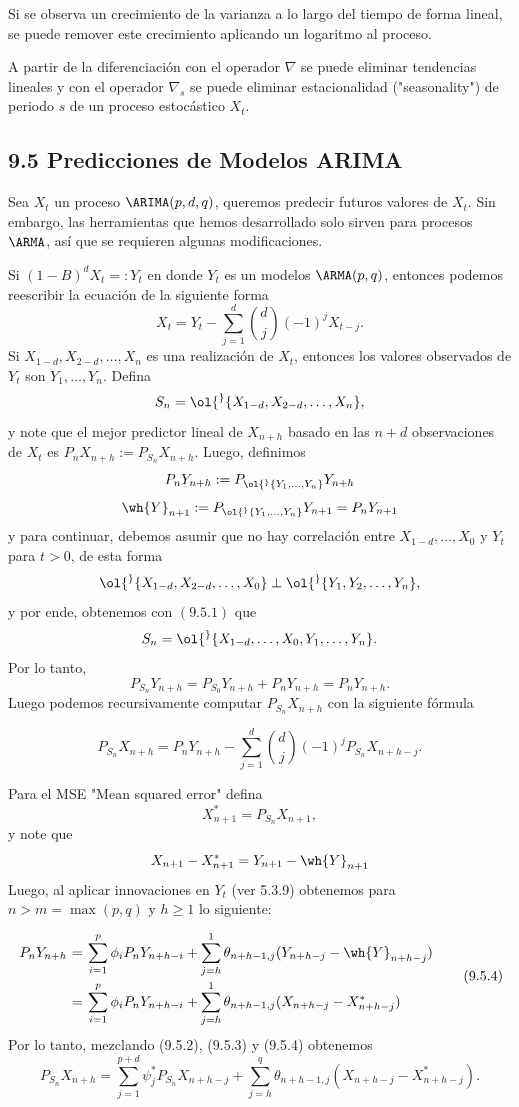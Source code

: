 Si se observa un crecimiento de la varianza a lo largo del tiempo de forma lineal, se puede remover este crecimiento aplicando un logaritmo al proceso.

A partir de la diferenciación con el operador $\nabla$ se puede eliminar tendencias lineales y con el operador $\nabla_s$ se puede eliminar estacionalidad ("seasonality") de periodo $s$ de un proceso estocástico $X_t$.

\subsection*{9.5 Predicciones de Modelos ARIMA}

Sea $X_t$ un proceso $\ARIMA(p,d,q)$, queremos predecir futuros valores de $X_t$. Sin embargo, las herramientas que hemos desarrollado solo sirven para procesos $\ARMA$, así que se requieren algunas modificaciones.

Si $(1-B)^d X_t =: Y_t$ en donde $Y_t$ es un modelos $\ARMA(p,q)$, entonces podemos reescribir la ecuación de la siguiente forma
\[ X_t = Y_t - \sum_{j = 1}^{d} \binom{d}{j} (-1)^j  X_{t-j}. \tag{9.5.1}\]
Si $X_{1-d},X_{2-d},\ldots,X_n$ es una realización de $X_t$, entonces los valores observados de $Y_t$ son $Y_1,\ldots, Y_n$. Defina
\[ S_n = \ol{\sp}\{X_{1-d},X_{2-d},\ldots,X_n\}, \]
y note que el mejor predictor lineal de $X_{n+h}$ basado en las $n+d$ observaciones de $X_t$ es $P_n X_{n+h} := P_{S_n} X_{n+h}$. Luego, definimos
\[ P_n Y_{n+h} := P_{\ol{\sp}\{Y_1,\ldots, Y_n\}} Y_{n+h} \]
\[ \wh{Y}_{n+1} := P_{\ol{\sp}\{Y_1,\ldots, Y_n\}} Y_{n+1} = P_n Y_{n+1} \]
y para continuar, debemos asumir que no hay correlación entre $X_{1-d},\ldots, X_0$ y $Y_t$ para $t > 0$, de esta forma
\[ \ol{\sp}\{X_{1-d},X_{2-d},\ldots,X_0\} \perp \ol{\sp}\{Y_{1},Y_{2},\ldots,Y_n\}, \]
y por ende, obtenemos con $(9.5.1)$ que
\[ S_n = \ol{\sp}\{X_{1-d},\ldots,X_0, Y_1, \ldots, Y_n\}.  \]
Por lo tanto,
\[ P_{S_n} Y_{n+h} = P_{S_0} Y_{n+h} + P_n Y_{n+h} = P_n Y_{n+h}. \tag{9.5.2}\]
Luego podemos recursivamente computar $P_{S_n}X_{n+h}$ con la siguiente fórmula

\[ P_{S_n} X_{n+h} = P_n Y_{n+h} - \sum_{j = 1}^{d} \binom{d}{j}(-1)^j P_{S_n} X_{n+h-j}.  \tag{9.5.3}\]

Para el MSE "Mean squared error" defina
\[ X_{n+1}^* = P_{S_n} X_{n+1}, \]
y note que
\[ X_{n+1} - X_{n+1}^* = Y_{n+1} - \wh{Y}_{n+1} \]
Luego, al aplicar innovaciones en $Y_t$ (ver 5.3.9) obtenemos para $n > m = \max(p,q)$ y $h \geq 1$ lo siguiente:
\[ \everymath{\displaystyle}
\arraycolsep=1.8pt\def\arraystretch{2.5}
\begin{array}{rcl}
    P_n Y_{n+h} & = & \sum_{i = 1}^{p}\phi_i P_n Y_{n+h-i} + \sum_{j = h}^1 \theta_{n+h-1,j} (Y_{n+h-j} - \wh{Y}_{n+h-j})\\
    & = & \sum_{i = 1}^{p}\phi_i P_n Y_{n+h-i} + \sum_{j = h}^1 \theta_{n+h-1,j} (X_{n+h-j} - X_{n+h-j}^*)
\end{array} \tag{9.5.4} \]
Por lo tanto, mezclando (9.5.2), (9.5.3) y (9.5.4) obtenemos
\[ P_{S_n} X_{n+h} = \sum_{j = 1}^{p+d} \psi_j^* P_{S_n} X_{n+h-j} + \sum_{j = h}^q \theta_{n+h-1,j} (X_{n+h-j} - X_{n+h-j}^*).\]

